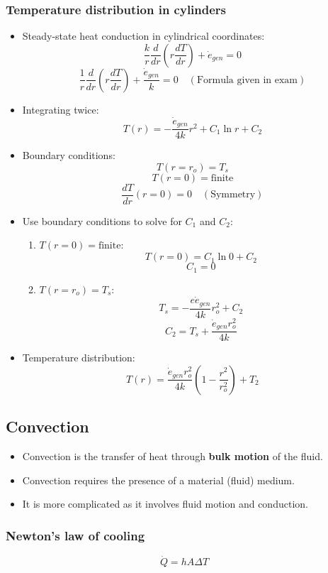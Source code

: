\documentclass[11pt]{article}
\begin{document}
\subsubsection{Temperature distribution in cylinders}
\label{sec:org7a56202}
\begin{itemize}
\item Steady-state heat conduction in cylindrical coordinates:
\[\frac{k}{r} \frac{d}{dr} \left(r \frac{dT}{dr} \right) + \dot{e}_{gen} = 0\]
\[\frac{1}{r} \frac{d}{dr} \left(r \frac{dT}{dr} \right) + \frac{\dot{e}_{gen}}{k} = 0 \quad (\text{Formula given in exam})\]
\item Integrating twice:
\[T(r) = - \frac{\dot{e}_{gen}}{4k} r^2 + C_1 \ln r + C_2\]
\item Boundary conditions:
\[T(r = r_o) = T_s\]
\[T(r = 0) = \text{finite}\]
\[\frac{dT}{dr}(r = 0) = 0 \quad (\text{Symmetry})\]
\item Use boundary conditions to solve for \(C_1\) and \(C_2\):
\begin{enumerate}
\item \(T(r = 0) = \text{finite}\):
\[T(r = 0) = C_1 \ln 0 + C_2\]
\[C_1 = 0\]
\item \(T(r= r_o) = T_s\):
\[T_s = - \frac{e\dot{e}_{gen}}{4k} r_o^2 + C_2\]
\[C_2 = T_s + \frac{\dot{e}_{gen} r_o^2}{4k}\]
\end{enumerate}
\item Temperature distribution:
\[T(r) = \frac{\dot{e}_{gen} r_o^2}{4k} \left(1 - \frac{r^2}{r_o^2} \right) + T_2\]
\end{itemize}

 \newpage
\subsection{Convection}
\label{sec:orga5104c4}
\begin{itemize}
\item Convection is the transfer of heat through \textbf{bulk motion} of the fluid.
\item Convection requires the presence of a material (fluid) medium.
\item It is more complicated as it involves fluid motion and conduction.
\end{itemize}
\subsubsection{Newton's law of cooling}
\label{sec:org5c96466}
\[\dot{Q} = hA \Delta T\]
\end{document}
